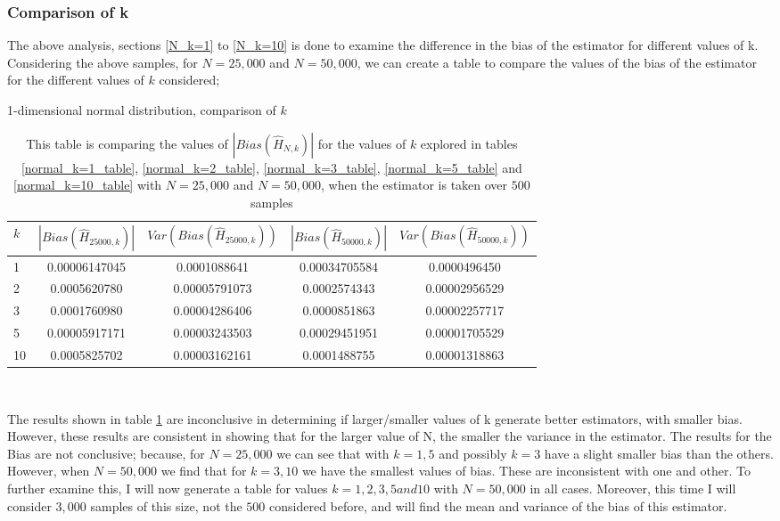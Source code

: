 \documentclass{article}
\begin{document}
\subsubsection{Comparison of k}

The above analysis, sections \ref{N_k=1} to \ref{N_k=10} is done to examine the difference in the bias of the estimator for different values of k. Considering the above samples, for $N=25,000$ and $N=50,000$, we can create a table to compare the values of the bias of the estimator for the different values of $k$ considered;

\begin{table}
\caption{1-dimensional normal distribution, comparison of $k$} \label{normal_kcompare_table}
\begin{center}
\begin{tabular}{| l | c c c c|} 
\toprule
$k$ & $|Bias(\hat{H}_{25000, k})|$ & $Var(Bias(\hat{H}_{25000, k}))$ & $|Bias(\hat{H}_{50000, k})|$ & $Var(Bias(\hat{H}_{50000, k}) )$ \\
\midrule[1pt]
1    & 0.00006147045   & 0.0001088641     & 0.00034705584   & 0.0000496450   \\
2    & 0.0005620780     & 0.00005791073   & 0.0002574343     & 0.00002956529 \\
3    & 0.0001760980     & 0.00004286406   & 0.0000851863     & 0.00002257717 \\
5    & 0.00005917171   & 0.00003243503   & 0.00029451951   & 0.00001705529 \\
10  & 0.0005825702     & 0.00003162161   & 0.0001488755     & 0.00001318863 \\
\hline
\end{tabular}
\\[10pt]
\caption*{This table is comparing the values of $|Bias(\hat{H}_{N, k})|$ for the values of $k$ explored in tables \ref{normal_k=1_table}, \ref{normal_k=2_table}, \ref{normal_k=3_table}, \ref{normal_k=5_table} and  \ref{normal_k=10_table} with $N=25,000$ and $N=50,000$, when the estimator is taken over $500$ samples}
\end{center}
\end{table}

The results shown in table \ref{normal_kcompare_table} are inconclusive in determining if larger/smaller values of k generate better estimators, with smaller bias. However, these results are consistent in showing that for the larger value of N, the smaller the variance in the estimator. The results for the Bias are not conclusive; because, for $N=25,000$ we can see that with $k=1, 5$ and possibly $k=3$ have a slight smaller bias than the others. However, when $N=50,000$ we find that for $k=3, 10$ we have the smallest values of bias. These are inconsistent with one and other. To further examine this, I will now generate a table for values $k=1, 2, 3, 5 and 10$ with $N=50,000$ in all cases. Moreover, this time I will consider $3,000$ samples of this size, not the $500$ considered before, and will find the mean and variance of the bias of this estimator.
\end{document}

